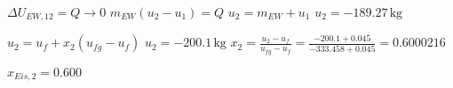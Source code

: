 \( \Delta U_{EW,12} = Q \rightarrow 0 \)  
\( m_{EW} (u_2 - u_1) = Q \)  
\( u_2 = m_{EW} + u_1 \)  
\( u_2 = -189.27 \, \text{kg} \)  

\( u_2 = u_f + x_2 (u_{fg} - u_f) \)  
\( u_2 = -200.1 \, \text{kg} \)  
\( x_2 = \frac{u_2 - u_f}{u_{fg} - u_f} = \frac{-200.1 + 0.045}{-333.458 + 0.045} = 0.6000216 \)  

\( x_{Eis,2} = 0.600 \)
